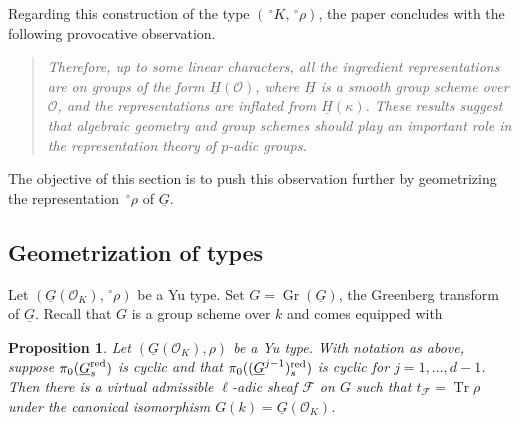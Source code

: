\documentclass[10pt]{amsart}
\theoremstyle{plain}
\newtheorem{proposition}[theorem]{Proposition}
\theoremstyle{definition}
\newcommand{\OK}{\mathcal{O}_K}
\newcommand{\Fq}{k}
\DeclareMathOperator{\Gr}{Gr}
\DeclareMathOperator{\trace}{Tr}
\newcommand{\trFrob}[1]{t_{#1}}
\begin{document}
Regarding this construction of the type $(\,^\circ  K,\,^\circ \rho)$, the paper \cite{yu:models} concludes with the following provocative observation.
\begin{quotation}
{\it Therefore, up to some linear characters, all the ingredient representations are on groups of
 the form $\underline{H}(\mathcal{O})$, where $\underline{H}$ is a smooth group scheme over $\mathcal{O}$, and the representations are inflated from $\underline{H}(\kappa)$. These results suggest that algebraic geometry and group schemes should play an
important role in the representation theory of $p$-adic groups.} \cite{yu:models}
\end{quotation}
%
The objective of this section is to push this observation further by geometrizing the representation $\,^\circ \rho$ of $\underline{G}$.

\subsection{Geometrization of types}

Let $(\underline{G}(\OK),\,^\circ \rho)$ be a Yu type.
Set $G = \Gr(\underline{G})$, the Greenberg transform of $\underline{G}$.
Recall that $G$ is a group scheme over $\Fq$ and comes equipped with 


\begin{proposition}\label{prop:types}
Let $(\underline{G}(\OK),\rho)$ be a Yu type.
With notation as above, suppose $\pi_0(\underline{G}_s^{\operatorname{red}})$ is cyclic and that $\pi_0((\underline{G}^{j-1})_s^{\operatorname{red}})$ is cyclic for $j=1,\ldots, d-1$.
Then there is a virtual admissible $\ell$-adic sheaf $\mathcal{F}$ on $G$ such that $\trFrob{\mathcal{F}} = \trace \rho$ under the canonical isomorphism $G(\Fq) = \underline{G}(\OK)$.
\end{proposition}
\end{document}
